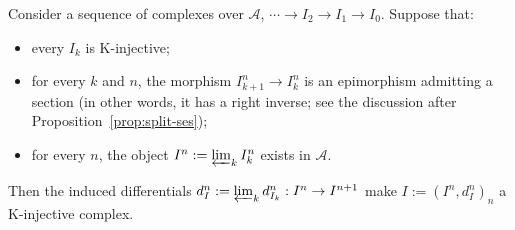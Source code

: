 \begin{lemma}\label{prop:K-injective-projlimit-aux}
	Consider a sequence of complexes over $\mathcal{A}$,
	$\cdots\to I_2\to I_1\to I_0$. Suppose that:
	\begin{itemize}
		\item every $I_k$ is K-injective;
		\item for every $k$ and $n$, the morphism
		$I_{k+1}^n\to I_k^n$ is an epimorphism admitting a section
		(in other words, it has a right inverse; see the discussion after
		Proposition~\ref{prop:split-ses});
		\item for every $n$, the object
		$I^n:=\varprojlim_k I_k^n$ exists in $\mathcal{A}$.
	\end{itemize}
	Then the induced differentials
	$d_I^n:=\varprojlim_k d_{I_k}^n:I^n\to I^{n+1}$ make
	$I:=(I^n,d_I^n)_n$ a K-injective complex.
\end{lemma}

